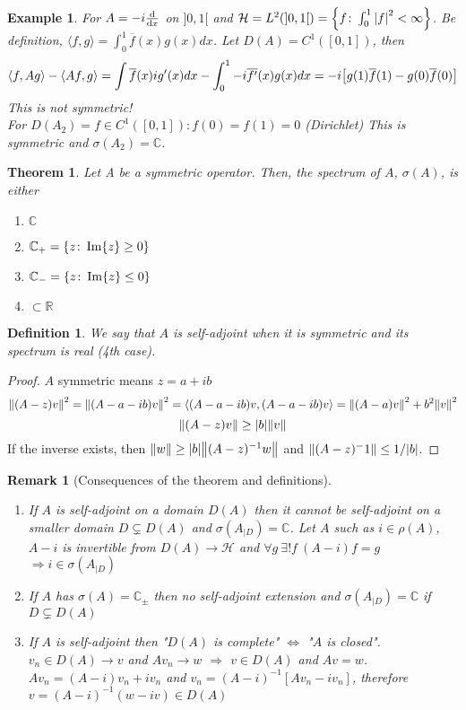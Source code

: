 \documentclass{article}
\newtheorem*{theorem}{Theorem}
\newtheorem*{definition}{Definition}
\newtheorem*{example}{Example}
\newtheorem*{remark}{Remark}
\newcommand{\RR}{\mathbb{R}}
\newcommand{\CC}{\mathbb{C}}
\newcommand{\cH}{\mathcal{H}}
\newcommand{\sig}{\sigma}
\renewcommand{\sp}[2]{\langle #1,#2 \rangle}
\begin{document}
\begin{example} 
  For $A = -i \dv{}{x}$ on $]0,1[$ and $\cH = L^2(]0,1[) = \qty{f \colon \int_0^1 \abs{f}^2 <\infty }$.
  Be definition, $\sp{f}{g} = \int_0^1 \overline{f}(x) g(x) dx$. 
  Let $D(A) = C^1([0,1])$, then
  $$ \sp{f}{Ag} - \sp{Af}{g} = \int \overline{f}(x) i g'(x) dx - \int_0^1 - i \overline{f'}(x) g(x) dx = -i \qty[ g(1) \overline{f}(1) - g(0) \overline{f}(0) ] $$
  This is not symmetric!
  \\
  For $D(A_2) = { f \in C^1([0,1]) \colon f(0) = f(1) = 0 }$ (Dirichlet)
  This is symmetric and $\sig(A_2) = \CC$.
\end{example} 

\begin{theorem}
  Let A be a symmetric operator. 
  Then, the spectrum of $A$, $\sig(A)$, is either 
  \begin{enumerate}
    \item $\CC$
    \item $\CC_+ = \qty{ z \colon \Im{z} \ge 0 }$ 
    \item $\CC_- = \qty{ z \colon \Im{z} \le 0 }$ 
    \item $\subset \RR$
  \end{enumerate}
\end{theorem}

\begin{definition} 
  We say that $A$ is self-adjoint when it is symmetric and its spectrum is real (4th case).
\end{definition}

\begin{proof} 
  $A$ symmetric means $z = a + i b$
  $$ \norm{(A-z) v}^2 = \norm{(A - a - i b) v}^2 = \sp{(A - a - i b)v}{(A - a - i b)v} = \norm{(A - a)v}^2 + b^2 \norm{v}^2 $$
  $$ \norm{(A-z)v} \ge \abs{b} \norm{v} $$
  If the inverse exists, then $\norm{w} \ge \abs{b} \norm{(A-z)^{-1} w}$ and $\norm{(A-z)^-1} \le 1/\abs{b}$.
\end{proof}

\begin{remark}[Consequences of the theorem and definitions]
  \begin{enumerate}
    \item If $A$ is self-adjoint on a domain $D(A)$ then it cannot be self-adjoint on a smaller domain $D \subsetneq D(A)$ and $\sig(A_{|D}) = \CC$.
    Let $A$ such as $i \in \rho(A)$, $A - i$ is invertible from $D(A) \to \cH$ and $\forall g \ \exists! f \ (A - i) f = g$ $\Rightarrow i \in \sig(A_{|D})$
    \item If $A$ has $\sig(A) = \CC_{\pm}$ then no self-adjoint extension and $\sig(A_{|D}) = \CC$ if $D \subsetneq D(A)$
    \item If $A$ is self-adjoint then "$D(A)$ is complete" $\Leftrightarrow$ "$A$ is closed".
    $v_n \in D(A) \to v$ and $A v_n \to w$ $\Rightarrow$ $v \in D(A)$ and $A v = w$.
    $A v_n = (A - i) v_n + i v_n$ and $v_n = (A - i)^{-1} [Av_n - i v_n]$, therefore $v = (A - i)^{-1} (w - i v) \in D(A)$
  \end{enumerate}
\end{remark}
\end{document}
